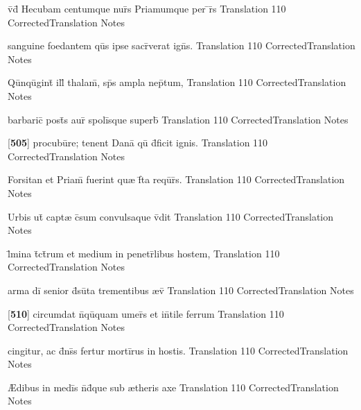 \latline
  {v\={\macron {\i}}d\={\macron {\i}} Hecubam centumque nur\={}s Priamumque per \={}r\={}s}
  { Translation }
  {110}
  { CorrectedTranslation }
  { Notes }


\latline
  {sanguine foedantem qu\={}s ipse sacr\={}verat ign\={\macron {\i}}s.}
  { Translation }
  {110}
  { CorrectedTranslation }
  { Notes }


\latline
  {Qu\={\macron {\i}}nqu\={}gint\={} ill\={\macron {\i}} thalam\={\macron {\i}}, sp\={}s ampla nep\={}tum,}
  { Translation }
  {110}
  { CorrectedTranslation }
  { Notes }


\latline
  {barbaric\={} post\={}s aur\={} spoli\={\macron {\i}}sque superb\={\macron {\i}}}
  { Translation }
  {110}
  { CorrectedTranslation }
  { Notes }


\latline
  {[\textbf{505}] procubu\={}re; tenent Dana\={\macron {\i}} qu\={} d\={}ficit ignis.}
  { Translation }
  {110}
  { CorrectedTranslation }
  { Notes }


\latline
  {Forsitan et Priam\={\macron {\i}} fuerint qu{\ae} f\={}ta requ\={\macron {\i}}r\={}s.}
  { Translation }
  {110}
  { CorrectedTranslation }
  { Notes }


\latline
  {Urbis ut\={\macron {\i}} capt{\ae} c\={}sum convulsaque v\={\macron {\i}}dit}
  { Translation }
  {110}
  { CorrectedTranslation }
  { Notes }


\latline
  {l\={\macron {\i}}mina t\={}ct\={}rum et medium in penetr\={}libus hostem,}
  { Translation }
  {110}
  { CorrectedTranslation }
  { Notes }


\latline
  {arma di\={} senior d\={}su\={}ta trementibus {\ae}v\={}}
  { Translation }
  {110}
  { CorrectedTranslation }
  { Notes }


\latline
  {[\textbf{510}] circumdat n\={}qu\={\macron {\i}}quam umer\={\macron {\i}}s et in\={}tile ferrum}
  { Translation }
  {110}
  { CorrectedTranslation }
  { Notes }


\latline
  {cingitur, ac d\={}ns\={}s fertur morti\={}rus in hostis.}
  { Translation }
  {110}
  { CorrectedTranslation }
  { Notes }


\latline
  {{\AE}dibus in medi\={\macron {\i}}s n\={}d\={}que sub {\ae}theris axe}
  { Translation }
  {110}
  { CorrectedTranslation }
  { Notes }


